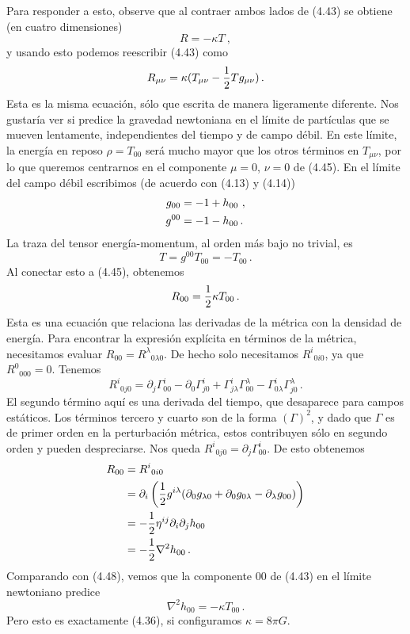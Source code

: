 \documentclass[11pt,b5paper,openany,twoside]{book}
\newcommand{\mn}{{\mu\nu}}
\newcommand{\p}[1]{{\partial_{#1}}}
\begin{document}
Para responder a esto, observe que al contraer ambos lados de (4.43) se obtiene (en cuatro dimensiones)
\begin{equation}
R = -\kappa T\ ,\label{4.44}
\end{equation}
y usando esto podemos reescribir (4.43) como
\begin{equation}
R_\mn = \kappa(T_\mn -{1\over 2}T g_\mn)\,.\label{4.45}
\end{equation}
Esta es la misma ecuación, sólo que escrita de manera ligeramente diferente.
Nos gustaría ver si predice la gravedad newtoniana en el límite de partículas que se mueven lentamente, independientes del tiempo y de campo débil.
En este límite, la energía en reposo $\rho=T_{00}$ será mucho mayor que los otros términos en $T_\mn$, por lo que queremos centrarnos en el componente $\mu=0$, $\nu=0$ de (4.45).
En el límite del campo débil escribimos (de acuerdo con (4.13) y (4.14))
\begin{align}
g_{00}  &=  -1 +h_{00}\ , \notag\\
g^{00}  &=  -1 -h_{00}\,. \label{4.46}
\end{align}
La traza del tensor energía-momentum, al orden más bajo no trivial, es
\begin{equation}
T = g^{00}T_{00} = -T_{00}\,.\label{4.47}
\end{equation}
Al conectar esto a (4.45), obtenemos
\begin{equation}
R_{00} = {1\over 2} \kappa T_{00}\,.\label{4.48}
\end{equation}
Esta es una ecuación que relaciona las derivadas de la métrica con la densidad de energía.
Para encontrar la expresión explícita en términos de la métrica, necesitamos evaluar $R_{00} = R^\lambda{}_{0\lambda 0}$.
De hecho solo necesitamos $R^i{}_{0i0}$, ya que $R^0{}_{000}=0$.
Tenemos
\begin{equation}
R^i{}_{0j0} = \p{j}\Gamma^i_{00} - \p{0}\Gamma^i_{j0}
+\Gamma^i_{j\lambda}\Gamma^\lambda_{00}
-\Gamma^i_{0\lambda}\Gamma^\lambda_{j0}\,.\label{4.49}
\end{equation}
El segundo término aquí es una derivada del tiempo, que desaparece para campos estáticos.
Los términos tercero y cuarto son de la forma $(\Gamma)^2$, y dado que $\Gamma$ es de primer orden en la perturbación métrica, estos contribuyen sólo en segundo orden y pueden despreciarse.
Nos queda $R^i{}_{0j0} = \p{j}\Gamma^i_{00}$.
De esto obtenemos
\begin{align}
R_{00}  &=  R^i{}_{0i0} \notag \\
&=  \p{i}\left({1\over 2} g^{i\lambda}
(\p0 g_{ \lambda 0} + \p0 g_{0\lambda} - \p\lambda g_{00})\right) \notag \\
&=  -{1\over 2}\eta^{ij}\p{i}\p{j} h_{00} \notag \\
&=  -{1\over 2}\nabla^2h_{00}\,. \label{4.50}
\end{align}
Comparando con (4.48), vemos que la componente $00$ de (4.43) en el límite newtoniano predice
\begin{equation}
\nabla^2 h_{00} = -\kappa T_{00}\,.\label{4.51}
\end{equation}
Pero esto es exactamente (4.36), si configuramos $\kappa = 8\pi G$.
\end{document}
